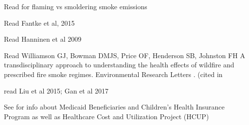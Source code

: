 Read \cite{kim_mutagenicity_2018} for flaming vs smoldering smoke emissions

Read Fantke et al, 2015 \cite{http://dx.doi.org/10.1007/s11367-014-0822-2}

Read Hanninen et al 2009 \cite{http://dx.doi.org/10.1038/jes.2008.31}

Read Williamson GJ, Bowman DMJS, Price OF, Henderson SB, Johnston FH \cite{williamson_transdisciplinary_2016} A transdisciplinary approach to understanding the health effects of wildfire and prescribed fire smoke regimes. Environmental Research Letters . (cited in \cite{hyde_air_2017}

read Liu et al 2015; Gan et al 2017

See \cite{vaidyanathan_developing_2018} for info about Medicaid Beneficiaries and Children's Health Insurance Program as well as Healthcare Cost and Utilization Project (HCUP)